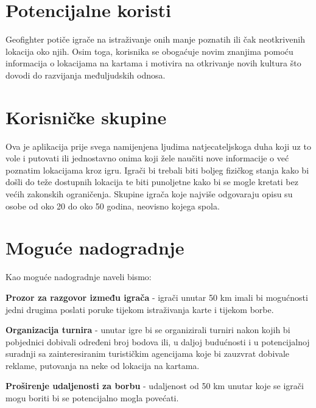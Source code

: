 		\section{Potencijalne koristi}
		
		{Geofighter potiče igrače na istraživanje onih manje poznatih ili čak neotkrivenih lokacija oko njih. Osim toga, korisnika se obogaćuje novim znanjima pomoću informacija o lokacijama na kartama i motivira na otkrivanje novih kultura što dovodi do razvijanja međuljudskih odnosa.} 
		
		\section{Korisničke skupine}
		
		{Ova je aplikacija prije svega namijenjena ljudima natjecateljskoga duha koji uz to vole i putovati ili jednostavno onima koji žele naučiti nove informacije o već poznatim lokacijama kroz igru. Igrači bi trebali biti boljeg fizičkog stanja kako bi došli do teže dostupnih lokacija te biti punoljetne kako bi se mogle kretati bez većih zakonskih ograničenja. Skupine igrača koje najviše odgovaraju opisu su osobe od oko 20 do oko 50 godina, neovisno kojega spola.}
		
		\section{Moguće nadogradnje}
		
		{Kao moguće nadogradnje naveli bismo:
		\begin{packed_item}
			\item {\textbf{Prozor za razgovor između igrača} - igrači unutar 50 km imali bi mogućnosti jedni drugima poslati poruke tijekom istraživanja karte i tijekom borbe.}\\
			\item {\textbf{Organizacija turnira} - unutar igre bi se organizirali turniri nakon kojih bi pobjednici dobivali određeni broj bodova ili, u daljoj budućnosti i u potencijalnoj suradnji sa zainteresiranim turističkim agencijama koje bi zauzvrat dobivale reklame, putovanja na neke od lokacija na kartama.}\\
			\item {\textbf{Proširenje udaljenosti za borbu} - udaljenost od 50 km unutar koje se igrači mogu boriti bi se potencijalno mogla povećati.} \\
	\end{packed_item} } 
		
